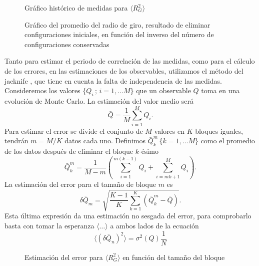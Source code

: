 \begin{figure}[h]
\centering
 \resizebox{\columnwidth}{!}{}\label{grafico_historico}
\caption{Gráfico histórico de medidas para $\langle R_G^2\rangle$}\label{grafico_historico}
\end{figure}    

\begin{figure}[h]
\centering
 \resizebox{\columnwidth}{!}{}
\caption{Gráfico del promedio del radio de giro, resultado de eliminar
  configuraciones iniciales, en función del inverso del número de configuraciones conservadas}\label{grafico_logtermal}
\end{figure}

Tanto para estimar el periodo de correlación de las medidas, como para el
cálculo de los errores, en las estimaciones de los observables, 
utilizamos el método del jacknife \cite{Juan:tesis}, que tiene en cuenta la
falta de independencia de las medidas. Consideremos los valores
$\{Q_i\,;\, i=1,\dots M\}$ que un observable $Q$ toma en una evolución de Monte
Carlo. La estimación del valor medio será
\begin{equation*}
\bar{Q}=\frac{1}{M}\sum^M_{i=1}Q_i.
\end{equation*}
Para estimar el error se divide el conjunto de $M$ valores en $K$ bloques
iguales, tendrán $m=M/K$ datos cada uno. Definimos $\bar{Q}^m_k \, \{k=1,\dots
M\}$ como el promedio de los datos después de eliminar el bloque $k$-ésimo
\begin{equation*}
\bar{Q}_k^m=\frac{1}{M-m}\left(\sum^{m(k-1)}_{i=1}Q_i+\sum^{M}_{i=mk+1}Q_i\right).
\end{equation*}
La estimación del error para el tamaño de bloque $m$ es
\begin{equation*}
\delta\bar{Q}_m=\sqrt{\frac{K-1}{K}\sum^K_{k=1}(\bar{Q}^m_k-\bar{Q})}.
\end{equation*}
Esta última expresión da una estimación no sesgada del error, para comprobarlo
basta con tomar la esperanza $\langle\dots \rangle$ a ambos lados de la ecuación
\begin{equation*}
\langle (\delta\bar{Q}_n)^2\rangle=\sigma^2(Q)\frac{1}{N} 
\end{equation*}

\begin{figure}[h]
\centering
 \resizebox{\columnwidth}{!}{}
\caption{Estimación del error para $\langle R_G^2\rangle$ en función del tamaño del bloque}\label{figura_ejemplo_error}
\end{figure} 

